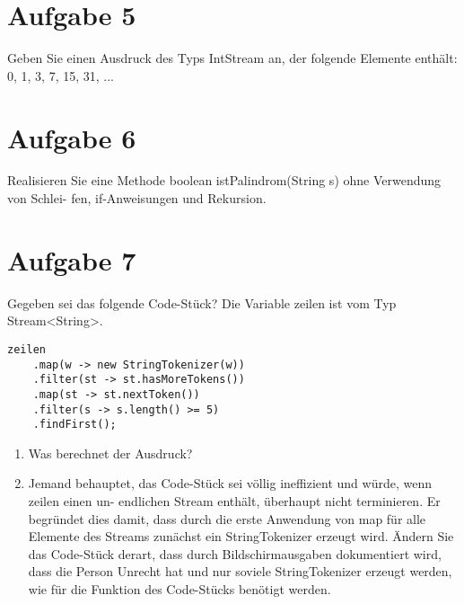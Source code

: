 \section{Aufgabe 5}
Geben Sie einen Ausdruck des Typs IntStream an, der folgende Elemente enthält:
0, 1, 3, 7, 15, 31, ...

\section{Aufgabe 6}
Realisieren Sie eine Methode boolean istPalindrom(String s) ohne Verwendung von
Schlei- fen, if-Anweisungen und Rekursion.

\section{Aufgabe 7}
Gegeben sei das folgende Code-Stück? Die Variable zeilen ist vom Typ
Stream<String>.

\begin{lstlisting}
zeilen
    .map(w -> new StringTokenizer(w))
    .filter(st -> st.hasMoreTokens())
    .map(st -> st.nextToken())
    .filter(s -> s.length() >= 5)
    .findFirst();
\end{lstlisting}

\begin{enumerate}
    \item Was berechnet der Ausdruck?
    \item Jemand behauptet, das Code-Stück sei völlig ineffizient und würde, wenn zeilen
          einen un- endlichen Stream enthält, überhaupt nicht terminieren. Er begründet
          dies damit, dass durch die erste Anwendung von map für alle Elemente des
          Streams zunächst ein StringTokenizer erzeugt wird. Ändern Sie das Code-Stück
          derart, dass durch Bildschirmausgaben dokumentiert wird, dass die Person
          Unrecht hat und nur soviele StringTokenizer erzeugt werden, wie für die
          Funktion des Code-Stücks benötigt werden.
\end{enumerate}